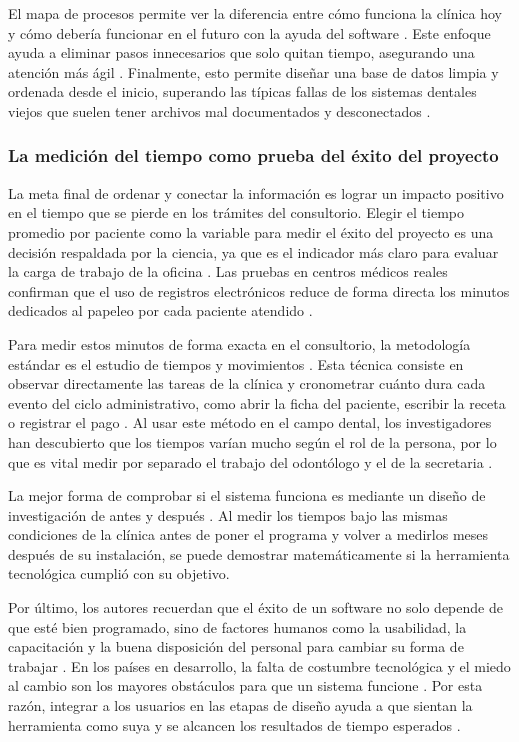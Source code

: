 El mapa de procesos permite ver la diferencia entre cómo funciona la clínica hoy y cómo debería funcionar en el futuro con la ayuda del software \cite{hoang2026data}. Este enfoque ayuda a eliminar pasos innecesarios que solo quitan tiempo, asegurando una atención más ágil \cite{alogla2025revisiting}. Finalmente, esto permite diseñar una base de datos limpia y ordenada desde el inicio, superando las típicas fallas de los sistemas dentales viejos que suelen tener archivos mal documentados y desconectados \cite{duncan2020structuring}.

\subsubsection{La medición del tiempo como prueba del éxito del proyecto}

La meta final de ordenar y conectar la información es lograr un impacto positivo en el tiempo que se pierde en los trámites del consultorio. Elegir el tiempo promedio por paciente como la variable para medir el éxito del proyecto es una decisión respaldada por la ciencia, ya que es el indicador más claro para evaluar la carga de trabajo de la oficina \cite{murad2024measuring}. Las pruebas en centros médicos reales confirman que el uso de registros electrónicos reduce de forma directa los minutos dedicados al papeleo por cada paciente atendido \cite{pmc2021electronic}.

Para medir estos minutos de forma exacta en el consultorio, la metodología estándar es el estudio de tiempos y movimientos \cite{cureus2022purpose}. Esta técnica consiste en observar directamente las tareas de la clínica y cronometrar cuánto dura cada evento del ciclo administrativo, como abrir la ficha del paciente, escribir la receta o registrar el pago \cite{lopetegui2014time}. Al usar este método en el campo dental, los investigadores han descubierto que los tiempos varían mucho según el rol de la persona, por lo que es vital medir por separado el trabajo del odontólogo y el de la secretaria \cite{schwei2016exploring}.

La mejor forma de comprobar si el sistema funciona es mediante un diseño de investigación de antes y después \cite{pmc2021electronic}. Al medir los tiempos bajo las mismas condiciones de la clínica antes de poner el programa y volver a medirlos meses después de su instalación, se puede demostrar matemáticamente si la herramienta tecnológica cumplió con su objetivo.

Por último, los autores recuerdan que el éxito de un software no solo depende de que esté bien programado, sino de factores humanos como la usabilidad, la capacitación y la buena disposición del personal para cambiar su forma de trabajar \cite{haddad2017perceived}. En los países en desarrollo, la falta de costumbre tecnológica y el miedo al cambio son los mayores obstáculos para que un sistema funcione \cite{tun2023clinical}. Por esta razón, integrar a los usuarios en las etapas de diseño ayuda a que sientan la herramienta como suya y se alcancen los resultados de tiempo esperados \cite{saladdin2025information}.